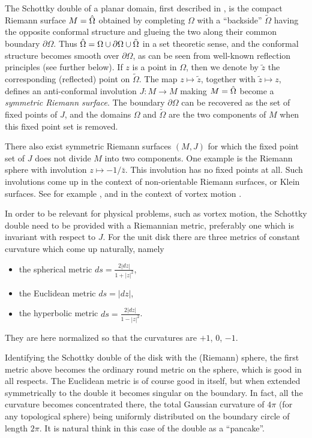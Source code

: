 \documentclass[reqno,12pt]{article}
\theoremstyle{plain}
\theoremstyle{definition}
\numberwithin{equation}{section}
\numberwithin{figure}{section}
\begin{document}
The Schottky double of a planar domain, first described in \cite{Schottky-1877},
is the compact Riemann surface $M=\Hat{\Omega}$ obtained by completing $\Omega$ with a ``backside'' $\tilde{\Omega}$
having the opposite conformal structure and glueing the two along their common boundary $\partial\Omega$. Thus 
$\Hat{\Omega}=\Omega \cup\partial\Omega\cup \tilde{\Omega}$ in a set theoretic sense, and the conformal structure becomes
smooth over $\partial\Omega$, as can be seen from well-known reflection principles (see further below). If $z$ is a point in $\Omega$,
then we denote by $\tilde{z}$ the corresponding (reflected) point on $\tilde{\Omega}$. The map $z\mapsto \tilde{z}$,
together with $\tilde{z}\mapsto z$, defines an anti-conformal involution $J:M\to M$ making $M=\Hat{\Omega}$ 
become a {\it symmetric Riemann surface}.
The boundary $\partial\Omega$ can be recovered as the set of fixed points of $J$, and the domains $\Omega$ and $\tilde{\Omega}$ are 
the two components of $M$ when this fixed point set is removed.

There also exist symmetric Riemann surfaces $(M,J)$ for which the fixed point set of $J$ does not divide $M$ into two
components. One example is the Riemann sphere with involution $z\mapsto -1/\bar{z}$. This involution has no fixed points at all.
Such involutions come up in the context of non-orientable Riemann surfaces, or Klein surfaces. See for example
\cite{Schiffer-Spencer-1954, Alling-Greenleaf-1971}, and in the context of vortex motion \cite{Balabanova-Montaldi-2022}.

In order to be relevant for physical problems, such as vortex motion, the Schottky double
need to be provided with a Riemannian metric, preferably one which is invariant with respect to $J$.
For the unit disk there are three metrics of constant curvature which come up naturally, namely
\begin{itemize}
\item the spherical metric $ds=\frac{2|dz|}{1+|z|^2}$,  
\item the Euclidean metric $ds=|dz|$,
\item  the hyperbolic metric $ds=\frac{2|dz|}{1-|z|^2}$.
\end{itemize}
They are here normalized so that the curvatures are $+1$, $0$, $-1$.  

Identifying the Schottky double of the disk with the (Riemann) sphere, the first metric above becomes the ordinary round metric 
on the sphere,
which is good in all respects. The Euclidean metric is of course good in itself, but when extended symmetrically to the double it
becomes singular on the boundary. In fact, all the curvature becomes concentrated there, the total Gaussian curvature of $4\pi$ 
(for any topological sphere) 
being uniformly distributed on the boundary circle of length $2\pi$. It is natural think in this case of the double as a ``pancake''.
\end{document}
